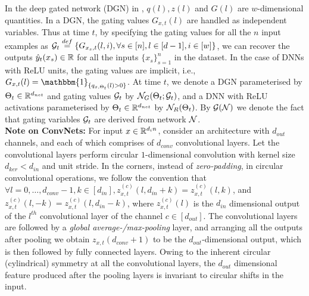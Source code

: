 In the deep gated network (DGN) in , $q(l),z(l)$ and $G(l)$ are $w$-dimensional quantities. In a DGN, the gating values $G_{x,t}(l)$ are handled as independent variables. Thus at time $t$, by specifying the gating values for all the $n$ input examples as $\mathcal{G}_t\stackrel{def}=\{G_{x_{s},t}(l,i), \forall s\in[n],l\in[d-1],i\in[w]\}$, we can recover the outputs $\hat{y}_t(x_s)\in \mathbb{R}$ for all the inputs $\{x_s\}_{s=1}^n$ in the dataset. In the case of DNNs with ReLU units, the gating values are implicit, i.e., $G_{x,t}(l)=\mathbbm{1}_{\{q_{x,\Theta_t}(l)>0\}}$. At time $t$, we denote a DGN parameterised by $\Theta_t\in \mathbb{R}^{d_{net}}$ and gating values $\mathcal{G}_t$ by $\mathcal{N}_G(\Theta_t;\mathcal{G}_t)$, and a DNN with ReLU activations parameterised by $\Theta_t\in\mathbb{R}^{d_{net}}$ by $\mathcal{N}_R(\Theta_t)$. By $\mathcal{G}(\mathcal{N})$ we denote the fact that gating variables  $\mathcal{G}_t$ are derived from network $\mathcal{N}$.\hfill\\
\textbf{Note on ConvNets:} For input $x\in\mathbb{R}^{d_in}$, consider an architecture with $d_{out}$ channels, and each of which comprises of $d_{conv}$ convolutional layers. Let the convolutional layers perform circular $1$-dimensional convolution with kernel size $d_{ker}<d_{in}$ and unit stride. In the corners, instead of \emph{zero-padding}, in circular convolutional operations, we follow the convention that $\forall l=0,\ldots, d_{conv}-1, k\in[d_{in}], z^{(c)}_{x,t}(l,d_{in}+k)=z^{(c)}_{x,t}(l,k)$, and $z^{(c)}_{x,t}(l,-k)=z^{(c)}_{x,t}(l,d_{in}-k)$, where $z^{(c)}_{x,t}(l)$ is the $d_{in}$ dimensional output of the $l^{th}$ convolutional layer of the channel $c\in[d_{out}]$. The convolutional layers are followed by a \emph{global average-/max-pooling} layer, and arranging all the outputs after pooling we obtain $z_{x,t}(d_{conv}+1)$ to be the $d_{out}$-dimensional output, which is then followed by fully connected layers. Owing to the inherent circular (cylindrical) symmetry at all the convolutional layers, the $d_{out}$ dimensional feature produced after the pooling layers is invariant to circular shifts in the input.
